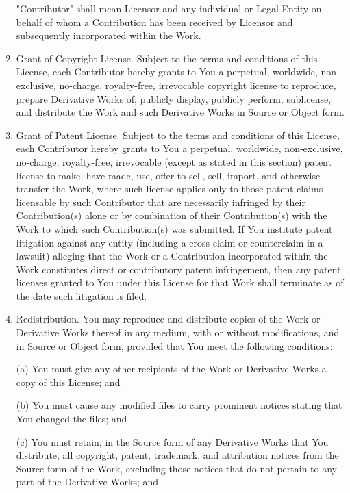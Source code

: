 \begin{enumerate}
"Contributor" shall mean Licensor and any individual or Legal Entity
on behalf of whom a Contribution has been received by Licensor and
subsequently incorporated within the Work.

\item   Grant of Copyright License.
Subject to the terms and conditions of
this License, each Contributor hereby grants to You a perpetual,
worldwide, non-exclusive, no-charge, royalty-free, irrevocable
copyright license to reproduce, prepare Derivative Works of,
publicly display, publicly perform, sublicense, and distribute the
Work and such Derivative Works in Source or Object form.

\item   Grant of Patent License. 
Subject to the terms and conditions of
this License, each Contributor hereby grants to You a perpetual,
worldwide, non-exclusive, no-charge, royalty-free, irrevocable
(except as stated in this section) patent license to make, have made,
use, offer to sell, sell, import, and otherwise transfer the Work,
where such license applies only to those patent claims licensable
by such Contributor that are necessarily infringed by their
Contribution(s) alone or by combination of their Contribution(s)
with the Work to which such Contribution(s) was submitted. If You
institute patent litigation against any entity (including a
cross-claim or counterclaim in a lawsuit) alleging that the Work
or a Contribution incorporated within the Work constitutes direct
or contributory patent infringement, then any patent licenses
granted to You under this License for that Work shall terminate
as of the date such litigation is filed.

\item   Redistribution.
You may reproduce and distribute copies of the
Work or Derivative Works thereof in any medium, with or without
modifications, and in Source or Object form, provided that You
meet the following conditions:

(a) You must give any other recipients of the Work or
Derivative Works a copy of this License; and

(b) You must cause any modified files to carry prominent notices
stating that You changed the files; and

(c) You must retain, in the Source form of any Derivative Works
that You distribute, all copyright, patent, trademark, and
attribution notices from the Source form of the Work,
excluding those notices that do not pertain to any part of
the Derivative Works; and


\end{enumerate}
